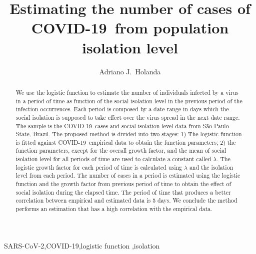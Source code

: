 \documentclass[review]{elsarticle}
\def\covid{\hbox{COVID-19}} %
\def\sarscov{\hbox{SARS-CoV-2}}
\begin{document}
\begin{frontmatter}

\title{Estimating the number of cases of \covid\ from population isolation level}

\author[mymainaddress,mysecondaryaddress]{Adriano J.\ Holanda}

\address[mymainaddress]{Department of Computing and Mathematics - Faculty of Philosophy, Science and Letters at Ribeir\~{a}o Preto - University of S\~{a}o Paulo, Ribeirão Preto, S\~{a}o Paulo, Brazil}
\address[mysecondaryaddress]{Faculty ``Dr.\ Francisco Maeda'', Ituverava, S\~{a}o Paulo, Brazil}


\begin{abstract}
We use the logistic function to estimate the number 
of individuals infected by a virus in a period of time
as function of the social isolation level 
in the previous period of the infection occurrences.
Each period is composed by a date range in days 
which the social isolation is supposed to take
effect over the virus spread in the next 
date range.
The sample is the \covid\ cases and 
social isolation level data from S\~{a}o Paulo State, Brazil.  
The proposed method is divided into two stages: 
1) The logistic function is fitted against \covid\ 
empirical data to obtain the function parameters; 
2) the function parameters, 
 except for the overall growth factor,
 and the mean of social isolation level for all periods of time 
are used to calculate a constant called $\lambda$.
The logistic growth factor for each period of time
is calculated using $\lambda$ 
and the isolation level from each period.
 The number of cases in a period is estimated using 
the logistic function and the growth factor 
from previous period of time 
to obtain the effect of social isolation during the
elapsed time. 
The period of time that produces a 
better correlation between empirical and estimated 
data is 5 days. 
We conclude the method performs an estimation that has 
a high correlation with the empirical data.
\end{abstract}

\begin{keyword}
\sarscov \sep \covid \sep logistic function \sep isolation
\end{keyword}

\end{frontmatter}
\end{document}
